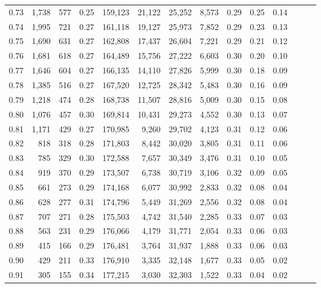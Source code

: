 \begin{tabular}{rrrrrrrrrrrrrr}
0.73 &  1,738 &  577 &  0.25 &  159,123 &   21,122 &  25,252 &   8,573 &  0.29 &  0.25 &      0.14 \\
0.74 &  1,995 &  721 &  0.27 &  161,118 &   19,127 &  25,973 &   7,852 &  0.29 &  0.23 &      0.13 \\
0.75 &  1,690 &  631 &  0.27 &  162,808 &   17,437 &  26,604 &   7,221 &  0.29 &  0.21 &      0.12 \\
0.76 &  1,681 &  618 &  0.27 &  164,489 &   15,756 &  27,222 &   6,603 &  0.30 &  0.20 &      0.10 \\
0.77 &  1,646 &  604 &  0.27 &  166,135 &   14,110 &  27,826 &   5,999 &  0.30 &  0.18 &      0.09 \\
0.78 &  1,385 &  516 &  0.27 &  167,520 &   12,725 &  28,342 &   5,483 &  0.30 &  0.16 &      0.09 \\
0.79 &  1,218 &  474 &  0.28 &  168,738 &   11,507 &  28,816 &   5,009 &  0.30 &  0.15 &      0.08 \\
0.80 &  1,076 &  457 &  0.30 &  169,814 &   10,431 &  29,273 &   4,552 &  0.30 &  0.13 &      0.07 \\
0.81 &  1,171 &  429 &  0.27 &  170,985 &    9,260 &  29,702 &   4,123 &  0.31 &  0.12 &      0.06 \\
0.82 &    818 &  318 &  0.28 &  171,803 &    8,442 &  30,020 &   3,805 &  0.31 &  0.11 &      0.06 \\
0.83 &    785 &  329 &  0.30 &  172,588 &    7,657 &  30,349 &   3,476 &  0.31 &  0.10 &      0.05 \\
0.84 &    919 &  370 &  0.29 &  173,507 &    6,738 &  30,719 &   3,106 &  0.32 &  0.09 &      0.05 \\
0.85 &    661 &  273 &  0.29 &  174,168 &    6,077 &  30,992 &   2,833 &  0.32 &  0.08 &      0.04 \\
0.86 &    628 &  277 &  0.31 &  174,796 &    5,449 &  31,269 &   2,556 &  0.32 &  0.08 &      0.04 \\
0.87 &    707 &  271 &  0.28 &  175,503 &    4,742 &  31,540 &   2,285 &  0.33 &  0.07 &      0.03 \\
0.88 &    563 &  231 &  0.29 &  176,066 &    4,179 &  31,771 &   2,054 &  0.33 &  0.06 &      0.03 \\
0.89 &    415 &  166 &  0.29 &  176,481 &    3,764 &  31,937 &   1,888 &  0.33 &  0.06 &      0.03 \\
0.90 &    429 &  211 &  0.33 &  176,910 &    3,335 &  32,148 &   1,677 &  0.33 &  0.05 &      0.02 \\
0.91 &    305 &  155 &  0.34 &  177,215 &    3,030 &  32,303 &   1,522 &  0.33 &  0.04 &      0.02 \\

\end{tabular}
